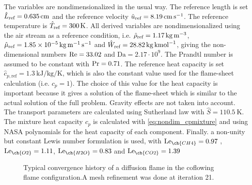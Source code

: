 The variables are nondimensionalized in the usual way. The reference length is set $\hat L_{\text{ref}} =  \SI{0.635}{\centi \meter}$ and the reference velocity $\hat u_{\text{ref}} =\SI{8.19}{\centi \meter \per \second}$. The reference temperature is $\hat T_{\text{ref}} =\SI{300}{K}$.  All derived variables are nondimensionalized using the air stream as a reference condition, i.e. $\hat \rho_{\text{ref}} = \SI{1.17}{\kilo \gram \per \cubic \meter}$, $\hat \mu_{\text{ref}} = \SI{1.85e-5}{\kilo \gram \per \meter \per \second}$ and $\hat W_{\text{ref}} = \SI{28.82}{\kilo \gram \per \kilo\mole}$, giving the non-dimensional numbers $\text{Re} = 33.02$ and $\text{Da} = 2.17\cdot 10^9$. The Prandtl number is assumed to be constant with $\text{Pr} = 0.71$. The reference heat capacity is set $\hat{c}_{p,\text{ref}}= \SI{1.3}{\kilo \joule \per \kilo \gram \per \kelvin}$, which is also the constant value used for the flame-sheet calculation (i.e. $c_p = 1$). The choice of this value for the heat capacity is important because it gives a solution of the flame-sheet which is similar to the actual solution of the full problem. Gravity effects are not taken into account. The transport parameters are calculated using Sutherland law with $\hat{S} = \SI{110.5}{\kelvin}$. The mixture heat capacity $c_p$ is calculated with \cref{eq:nondim_cpmixture} and using NASA polynomials for the heat capacity of each component. Finally. a non-unity but constant Lewis number formulation is used, with
$\Lewis_{\ch{CH4}} =  0.97 $ , $\Lewis_{\ch{O2}} = 1.11 $, $\Lewis_{\ch{H2O}} = 0.83 $ and $\Lewis_{\ch{CO2}} = 1.39 $ \parencite{smookePremixedNonpremixedTest1991}
\begin{figure}[b!]
	\centering
	\caption{Typical convergence history of a diffusion flame in the coflowing flame configuration.A mesh refinement was done at iteration 21. }
	\label{fig:CoFlow_ConvergenceStory}
\end{figure}
